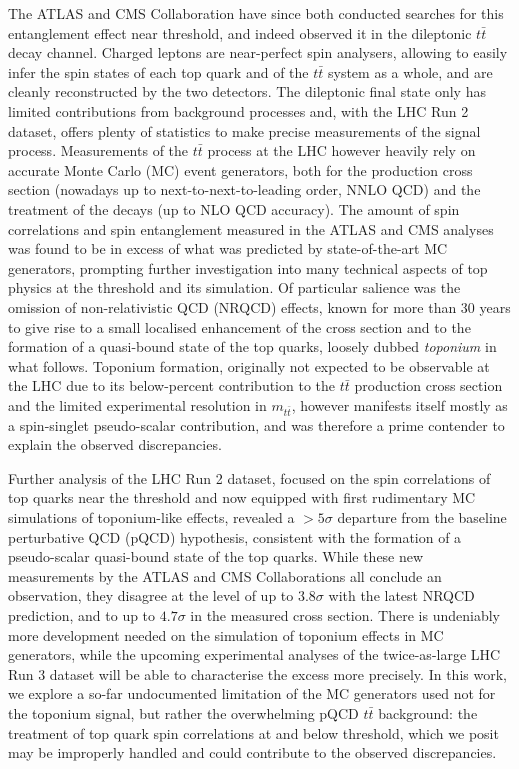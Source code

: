 \documentclass[aps,prd,twocolumn,floatfix,superscriptaddress,longbibliography,10pt]{revtex4-2}
\newcommand{\ttbar}{{\ensuremath{t\bar{t}}}\xspace}
\newcommand{\mttbar}{\ensuremath{m_{\ttbar}}\xspace}
\begin{document}
The ATLAS and CMS Collaboration have since both conducted searches for this entanglement effect near threshold, and indeed observed it in the dileptonic \ttbar decay channel.
Charged leptons are near-perfect spin analysers, allowing to easily infer the spin states of each top quark and of the \ttbar system as a whole, and are cleanly reconstructed by the two detectors.
The dileptonic final state only has limited contributions from background processes and, with the LHC Run 2 dataset, offers plenty of statistics to make precise measurements of the signal process.
Measurements of the \ttbar process at the LHC however heavily rely on accurate Monte Carlo (MC) event generators, both for the production cross section (nowadays up to next-to-next-to-leading order, NNLO QCD) and the treatment of the decays (up to NLO QCD accuracy).
The amount of spin correlations and spin entanglement measured in the ATLAS and CMS analyses was found to be in excess of what was predicted by state-of-the-art MC generators, prompting further investigation into many technical aspects of top physics at the threshold and its simulation.
Of particular salience was the omission of non-relativistic QCD (NRQCD) effects, known for more than 30 years to give rise to a small localised enhancement of the cross section and to the formation of a quasi-bound state of the top quarks, loosely dubbed \emph{toponium} in what follows.
Toponium formation, originally not expected to be observable at the LHC due to its below-percent contribution to the \ttbar production cross section and the limited experimental resolution in \mttbar, however manifests itself mostly as a spin-singlet pseudo-scalar contribution, and was therefore a prime contender to explain the observed discrepancies.

Further analysis of the LHC Run 2 dataset, focused on the spin correlations of top quarks near the threshold and now equipped with first rudimentary MC simulations of toponium-like effects, revealed a $>5\sigma$ departure from the baseline perturbative QCD (pQCD) hypothesis, consistent with the formation of a pseudo-scalar quasi-bound state of the top quarks.
While these new measurements by the ATLAS and CMS Collaborations all conclude an observation, they disagree at the level of up to $3.8\sigma$ with the latest NRQCD prediction, and to up to $4.7\sigma$ in the measured cross section.
There is undeniably more development needed on the simulation of toponium effects in MC generators, while the upcoming experimental analyses of the twice-as-large LHC Run 3 dataset will be able to characterise the excess more precisely.
In this work, we explore a so-far undocumented limitation of the MC generators used not for the toponium signal, but rather the overwhelming pQCD \ttbar background: the treatment of top quark spin correlations at and below threshold, which we posit may be improperly handled and could contribute to the observed discrepancies.
\end{document}
